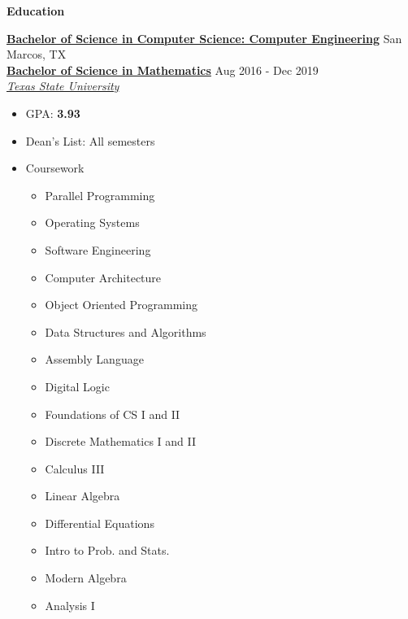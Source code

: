 \documentclass[letterpaper, 10pt]{article}
\newcommand{\resheading}[1]{
    \begin{mdframed}[
        backgroundcolor=black!15,
        linewidth=0.75pt,
        innertopmargin=4pt,
        innerbottommargin=4pt,
        skipabove=6pt,
        skipbelow=2pt]
        \textbf{\large #1}
    \end{mdframed}
}
\newcommand{\dressubheading}[5]{
    \textbf{#1} \hfill #2 \\[0pt]
    \textbf{#3} \hfill #4 \\[0pt]
    \textit{#5} \\[0pt]
}
\newenvironment{resitemize}{
    \vspace{-6pt}
    \begin{itemize}
    \setlength\itemsep{-2pt}
}{
    \end{itemize}
}
\begin{document}
\begin{NoHyper}
\resheading{Education}
    \dressubheading{\href{http://mycatalog.txstate.edu/undergraduate/science-engineering/computer/computer-science-concentration-engineering-bs/}{Bachelor of Science in Computer Science:    Computer Engineering}}
        {San Marcos, TX}
        {\href{http://mycatalog.txstate.edu/undergraduate/science-engineering/mathematics/applied-bs/}{Bachelor of Science in Mathematics}}
        {Aug 2016 - Dec 2019}
        {\href{http://www.txstate.edu/}{Texas State University}}
        \begin{resitemize}
            \item GPA: \textbf{3.93}
            \item Dean's List: All semesters
            \item Coursework
            \vspace{-16pt}
            \begin{multicols}{3}
                \begin{resitemize}
                    \item Parallel Programming
                    \item Operating Systems
                    \item Software Engineering
                    \item Computer Architecture
                    \item Object Oriented Programming
                \end{resitemize}
                \columnbreak
                \begin{resitemize}
                    \item Data Structures and Algorithms
                    \item Assembly Language
                    \item Digital Logic
                    \item Foundations of CS I and II
                    \item Discrete Mathematics I and II
                \end{resitemize}
                \columnbreak
                \begin{resitemize}
                    \item Calculus III
                    \item Linear Algebra
                    \item Differential Equations
                    \item Intro to Prob. and Stats.
                    \item Modern Algebra
                    \item Analysis I
                \end{resitemize}
            \end{multicols}
            \vspace{-16pt}
        \end{resitemize}


\end{NoHyper}
\end{document}
